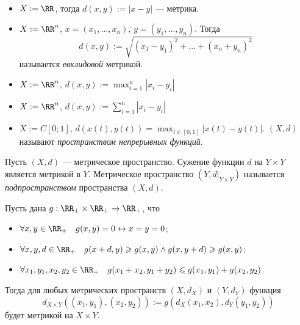 \documentclass[12pt,a4paper]{article}
\begin{document}
    \begin{example}\ 
        \begin{itemize}
            \item $X := \RR$, тогда $d(x, y) := |x-y|$ --- метрика.
            \item $X := \RR^n$, $x = (x_1, \dots, x_n)$, $y = (y_1, \dots, y_n)$. Тогда
                \[d(x, y) := \sqrt{(x_1 - y_1)^2 + \dots + (x_n + y_n)^2}\]
                называется \emph{евклидовой} метрикой.
            \item $X := \RR^n$, $d(x, y) := \max_{i = 1}^n |x_i - y_i|$
            \item $X := \RR^n$, $d(x, y) := \sum_{i = 1}^n |x_i - y_i|$
            \item $X := C[0; 1]$, $d(x(t), y(t)) = \max_{t \in [0; 1]} |x(t) - y(t)|$. $(X, d)$ называют \emph{пространством непрерывных функций}.
        \end{itemize}
    \end{example}

    \begin{definition}
        Пусть $(X, d)$ --- метрическое пространство. Сужение функции $d$ на $Y \times Y$ является метрикой в $Y$. Метрическое пространство $(Y, d|_{Y\times Y})$ называется \emph{подпространством} пространства $(X, d)$.
    \end{definition}

    \begin{theorem}\label{generalised_metric_spaces_multiplication_theorem}
        Пусть дана $g: \RR_+ \times \RR_+ \to \RR_+$, что
        \begin{itemize}
            \item $\forall x, y \in \RR_+\quad g(x, y) = 0 \leftrightarrow x = y = 0$;
            \item $\forall x, y, d \in \RR_+\quad g(x + d, y) \geqslant g(x, y) \wedge g(x, y + d) \geqslant g(x, y)$;
            \item $\forall x_1, y_1, x_2, y_2 \in \RR_+ \quad g(x_1 + x_2, y_1 + y_2) \leqslant g(x_1, y_1) + g(x_2, y_2)$.
        \end{itemize}
        Тогда для любых метрических пространств $(X, d_X)$ и $(Y, d_Y)$ функция
        \[d_{X \times Y}((x_1, y_1), (x_2, y_2)) := g(d_X(x_1, x_2), d_Y(y_1, y_2))\]
        будет метрикой на $X \times Y$.
    \end{theorem}
\end{document}
